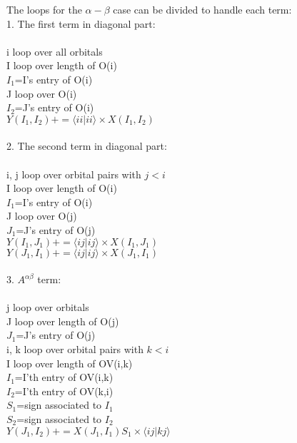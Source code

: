\documentclass[twocolumn]{article}
\begin{document}
The loops for the $\alpha-\beta$ case can be divided to handle each term:\\
1. The first term in diagonal part:\\
\\
i loop over all orbitals\\
\indent I loop over length of O(i)\\
\indent\indent $I_1$=I's entry of O(i)\\
\indent\indent J loop over O(i)\\
\indent\indent\indent $I_2$=J's entry of O(i)\\
\indent\indent\indent $Y(I_1,I_2)+=\langle ii|ii\rangle\times X(I_1,I_2)$\\
\\
2. The second term in diagonal part:\\
\\
i, j loop over orbital pairs with $j<i$\\
\indent I loop over length of O(i)\\
\indent\indent $I_1$=I's entry of O(i)\\
\indent\indent J loop over O(j)\\
\indent\indent\indent $J_1$=J's entry of O(j)\\
\indent\indent\indent $Y(I_1,J_1)+=\langle ij|ij\rangle\times X(I_1,J_1)$\\
\indent\indent\indent $Y(J_1,I_1)+=\langle ij|ij\rangle\times X(J_1,I_1)$\\
\\
3. $A^{\alpha\beta}$ term:\\
\\
j loop over orbitals\\
\indent J loop over length of O(j)\\
\indent\indent $J_1$=J's entry of O(j)\\
\indent\indent i, k loop over orbital pairs with $k<i$\\
\indent\indent\indent I loop over length of OV(i,k)\\
\indent\indent\indent\indent $I_1$=I'th entry of OV(i,k)\\
\indent\indent\indent\indent $I_2$=I'th entry of OV(k,i)\\
\indent\indent\indent\indent $S_1$=sign associated to $I_1$\\
\indent\indent\indent\indent $S_2$=sign associated to $I_2$\\
\indent\indent\indent\indent $Y(J_1,I_2)+=X(J_1,I_1) S_1\times\langle ij|kj\rangle$\\
\end{document}
